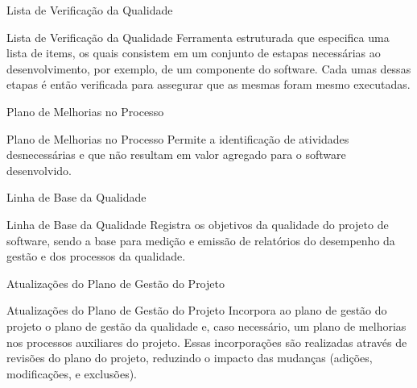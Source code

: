 \documentclass[xcolor=x11names,compress]{beamer}
\begin{document}
\begin{frame}{Lista de Verificação da Qualidade}

\begin{alertblock}{Lista de Verificação da Qualidade}
Ferramenta estruturada que especifica uma lista de items, os quais consistem em um conjunto de estapas necessárias ao desenvolvimento, por exemplo, de um componente do software. Cada umas dessas etapas é então verificada para assegurar que as mesmas foram mesmo executadas.
\end{alertblock}

\end{frame}

\begin{frame}{Plano de Melhorias no Processo}

\begin{alertblock}{Plano de Melhorias no Processo}
Permite a identificação de atividades desnecessárias e que não resultam em valor agregado para o software desenvolvido.
\end{alertblock}

\end{frame}

\begin{frame}{Linha de Base da Qualidade}

\begin{alertblock}{Linha de Base da Qualidade}
Registra os objetivos da qualidade do projeto de software, sendo a base para medição e emissão de relatórios do desempenho da gestão e dos processos da qualidade.
\end{alertblock}

\end{frame}

\begin{frame}{Atualizações do Plano de Gestão do Projeto}

\begin{alertblock}{Atualizações do Plano de Gestão do Projeto}
Incorpora ao plano de gestão do projeto o plano de gestão da qualidade e, caso necessário, um plano de melhorias nos processos auxiliares do projeto. Essas incorporações são realizadas através de revisões do plano do projeto, reduzindo o impacto das mudanças (adições, modificações, e exclusões). 

\end{alertblock}

\end{frame}

\end{document}

